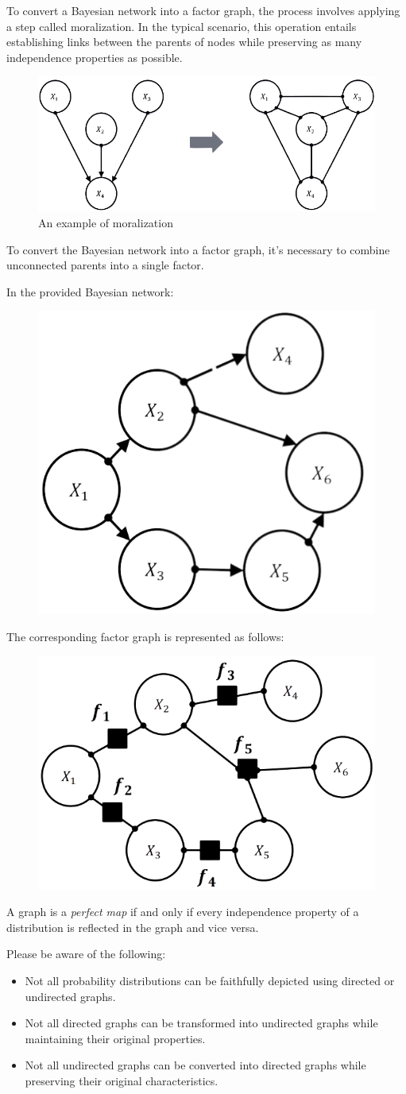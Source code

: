 \documentclass[12pt, a4paper]{report}
\begin{document}
    To convert a Bayesian network into a factor graph, the process involves applying a step called moralization. 
    In the typical scenario, this operation entails establishing links between the parents of nodes while preserving as many independence properties as possible.
    \begin{figure}[H]
        \centering
        \includegraphics[width=0.5\linewidth]{images/mor.png}
        \caption{An example of moralization}
    \end{figure}
    To convert the Bayesian network into a factor graph, it's necessary to combine unconnected parents into a single factor.
    \begin{example}
        In the provided Bayesian network:
        \begin{figure}[H]
            \centering
            \includegraphics[width=0.25\linewidth]{images/bn.png}
        \end{figure}
        The corresponding factor graph is represented as follows:
        \begin{figure}[H]
            \centering
            \includegraphics[width=0.25\linewidth]{images/bnf.png}
        \end{figure}
    \end{example}
    \begin{definition}
        A graph is a \emph{perfect map} if and only if every independence property of a distribution is reflected in the graph and vice versa. 
    \end{definition}
    Please be aware of the following:
    \begin{itemize}
        \item Not all probability distributions can be faithfully depicted using directed or undirected graphs.
        \item Not all directed graphs can be transformed into undirected graphs while maintaining their original properties.
        \item Not all undirected graphs can be converted into directed graphs while preserving their original characteristics.
    \end{itemize}
\end{document}
